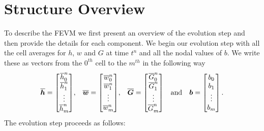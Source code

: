 \section{Structure Overview}
To describe the FEVM we first present an overview of the evolution step and then provide the details for each component. We begin our evolution step with all the cell averages for $h$, $w$ and $G$ at time $t^n$ and all the nodal values of $b$. We write these as vectors from the $0^{th}$ cell to the $m^{th}$ in the following way
\begin{align*} \overline{\boldsymbol{h}} = \begin{bmatrix}
\overline{h}_0^n \\\overline{h}_1^n \\ \vdots \\ \overline{h}_m^n \end{bmatrix} &,& \overline{\boldsymbol{w}} = \begin{bmatrix}
\overline{w}_0^n \\\overline{w}_1^n \\ \vdots \\ \overline{w}_m^n \end{bmatrix} &,&  \overline{\boldsymbol{G}} = \begin{bmatrix}
\overline{G}_0^n \\\overline{G}_1^n \\ \vdots \\ \overline{G}_m^n \end{bmatrix}& &\text{and}& & \boldsymbol{b} = \begin{bmatrix}
b_{0} \\ b_{1} \\ \vdots \\b_{m}
\end{bmatrix}. \\
\end{align*}
The evolution step proceeds as follows:

